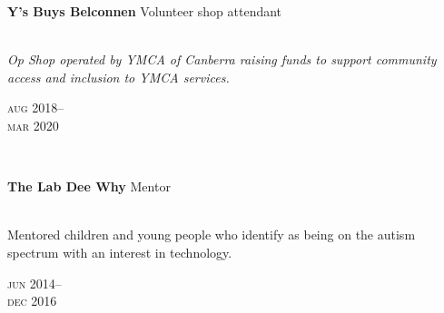 \begin{minipage}[t]{\mainboxwidth\textwidth}
\textbf{Y's Buys Belconnen}\phantom{..} Volunteer shop attendant\\
\\
{\small
\textit{Op Shop operated by YMCA of Canberra raising funds to support community access and inclusion to YMCA services.}
\par}
\end{minipage}
\begin{minipage}[t]{\detailboxwidth\textwidth}
{
\hfill \textsc{aug} 2018--\\ 
\hspace*{0pt} \hfill \textsc{mar} 2020
\par
}
\end{minipage}
\\


\begin{minipage}[t]{\mainboxwidth\textwidth}
\textbf{The Lab Dee Why}\phantom{..} Mentor \\
\\
{\small
Mentored children and young people who identify as being on the autism spectrum with an interest in technology.
\par}
\end{minipage}
\begin{minipage}[t]{\detailboxwidth\textwidth}
{
\hfill \textsc{jun} 2014--\\ 
\hspace*{0pt} \hfill \textsc{dec} 2016
\par
}
\end{minipage}
\\


